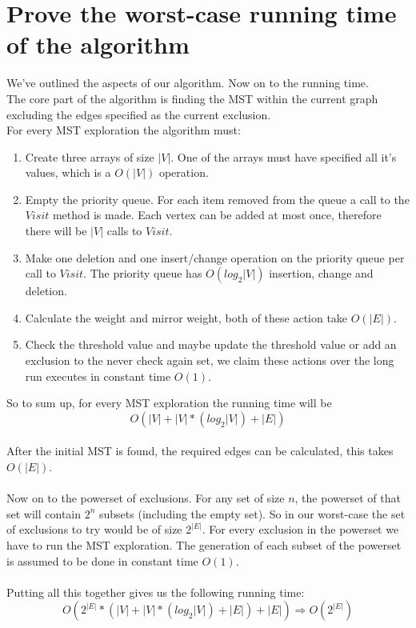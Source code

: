 \documentclass[12pt]{report}
\begin{document}
\section{Prove the worst-case running time of the algorithm}
We've outlined the aspects of our algorithm. Now on to the running time.\\
The core part of the algorithm is finding the MST within the current graph excluding the edges specified as the current exclusion.\\
For every MST exploration the algorithm must:
\begin{enumerate}
	\item Create three arrays of size $|V|$. One of the arrays must have specified all it's values, which is a $O(|V|)$ operation.
	\item Empty the priority queue. For each item removed from the queue a call to the $Visit$ method is made. Each vertex can be added at most once, therefore there will be $|V|$ calls to $Visit$.
	\item Make one deletion and one insert/change operation on the priority queue per call to $Visit$. The priority queue has $O(log_2 |V|)$ insertion, change and deletion.
	\item Calculate the weight and mirror weight, both of these action take $O(|E|)$.
	\item Check the threshold value and maybe update the threshold value or add an exclusion to the never check again set, we claim these actions over the long run executes in constant time $O(1)$.
\end{enumerate}
So to sum up, for every MST exploration the running time will be
$$O(|V| + |V|*(log_2 |V|) + |E|)$$
\\
After the initial MST is found, the required edges can be calculated, this takes $O(|E|)$.\\
\\
Now on to the powerset of exclusions. For any set of size $n$, the powerset of that set will contain $2^n$ subsets (including the empty set). So in our worst-case the set of exclusions to try would be of size $2^{|E|}$. For every exclusion in the powerset we have to run the MST exploration. The generation of each subset of the powerset is assumed to be done in constant time $O(1)$.\\
\\
Putting all this together gives us the following running time:
$$O(2^{|E|}*(|V| + |V|*(log_2 |V|) + |E|) + |E|) \Rightarrow O(2^{|E|})$$
\end{document}
